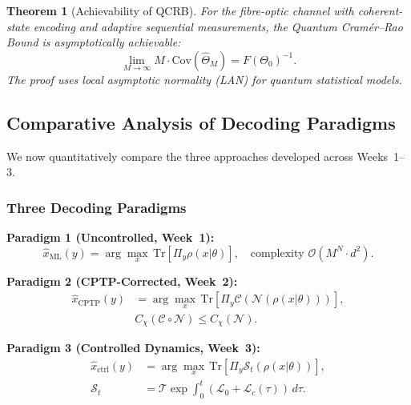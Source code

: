 \documentclass[journal,twocolumn]{IEEEtran}
\theoremstyle{definition}
\theoremstyle{plain}
\newtheorem{theorem}{Theorem}[section]
\newcommand{\Tr}{\mathrm{Tr}}
\begin{document}
\begin{theorem}[Achievability of QCRB]
For the fibre-optic channel with coherent-state encoding and adaptive
sequential measurements, the Quantum Cram\'{e}r--Rao Bound is
asymptotically achievable:
\begin{equation}
  \lim_{M\to\infty}M\cdot\mathrm{Cov}(\hat\Theta_M)=F(\Theta_0)^{-1}.
\end{equation}
The proof uses local asymptotic normality (LAN) for quantum statistical
models.
\end{theorem}

\subsection{Comparative Analysis of Decoding Paradigms}

We now quantitatively compare the three approaches developed across
Weeks~1--3.

\subsubsection{Three Decoding Paradigms}

\noindent\textbf{Paradigm 1 (Uncontrolled, Week~1):}
\begin{equation}
  \hat{x}_{\mathrm{ML}}(y)=\arg\max_x\,\Tr[\Pi_y\rho(x|\theta)],\quad
  \text{complexity }\mathcal{O}(M^N\cdot d^2).
\end{equation}

\noindent\textbf{Paradigm 2 (CPTP-Corrected, Week~2):}
\begin{align}
  \hat{x}_{\mathrm{CPTP}}(y) &= \arg\max_x\,
  \Tr[\Pi_y\mathcal{C}(\mathcal{N}(\rho(x|\theta)))],\nonumber\\
  & C_\chi(\mathcal{C}\circ\mathcal{N})\le C_\chi(\mathcal{N}).
\end{align}

\noindent\textbf{Paradigm 3 (Controlled Dynamics, Week~3):}
\begin{align}
  \hat{x}_{\mathrm{ctrl}}(y) &= \arg\max_x\,
  \Tr[\Pi_y\mathcal{S}_t(\rho(x|\theta))],\nonumber\\
  \mathcal{S}_t &= \mathcal{T}\exp\!\int_0^t
  (\mathcal{L}_0+\mathcal{L}_c(\tau))\,d\tau.
\end{align}
\end{document}
